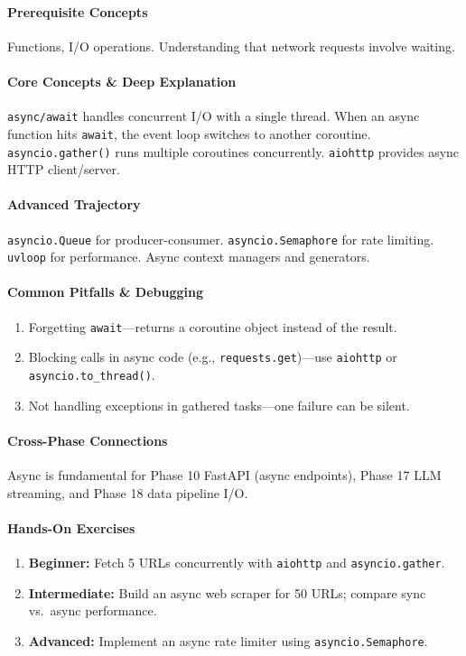 \documentclass[11pt, a4paper, oneside]{report}
\begin{document}
\paragraph{Prerequisite Concepts} Functions, I/O operations. Understanding that network requests involve waiting.

\paragraph{Core Concepts \& Deep Explanation} \texttt{async/await} handles concurrent I/O with a single thread. When an async function hits \texttt{await}, the event loop switches to another coroutine. \texttt{asyncio.gather()} runs multiple coroutines concurrently. \texttt{aiohttp} provides async HTTP client/server.

\paragraph{Advanced Trajectory} \texttt{asyncio.Queue} for producer-consumer. \texttt{asyncio.Semaphore} for rate limiting. \texttt{uvloop} for performance. Async context managers and generators.

\paragraph{Common Pitfalls \& Debugging}
\begin{enumerate}[leftmargin=*]
\item Forgetting \texttt{await}---returns a coroutine object instead of the result.
\item Blocking calls in async code (e.g., \texttt{requests.get})---use \texttt{aiohttp} or \texttt{asyncio.to\_thread()}.
\item Not handling exceptions in gathered tasks---one failure can be silent.
\end{enumerate}

\paragraph{Cross-Phase Connections} Async is fundamental for Phase 10 FastAPI (async endpoints), Phase 17 LLM streaming, and Phase 18 data pipeline I/O.

\paragraph{Hands-On Exercises}
\begin{enumerate}[leftmargin=*]
\item \textbf{Beginner:} Fetch 5 URLs concurrently with \texttt{aiohttp} and \texttt{asyncio.gather}.
\item \textbf{Intermediate:} Build an async web scraper for 50 URLs; compare sync vs.\ async performance.
\item \textbf{Advanced:} Implement an async rate limiter using \texttt{asyncio.Semaphore}.
\end{enumerate}
\end{document}
